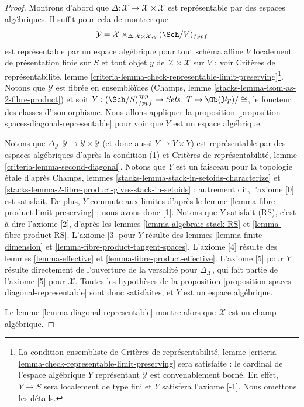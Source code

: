 \begin{proof}
Montrons d'abord que
$\Delta : \mathcal{X} \to \mathcal{X} \times \mathcal{X}$ est représentable
par des espaces algébriques. Il suffit pour cela de montrer que
$$
\mathcal{Y} =
\mathcal{X} \times_{\Delta, \mathcal{X} \times \mathcal{X}, y} (\Sch/V)_{fppf}
$$
est représentable par un espace algébrique pour tout schéma affine $V$
localement de présentation finie sur $S$ et tout objet $y$ de
$\mathcal{X} \times \mathcal{X}$ sur $V$ ; voir Critères de représentabilité,
lemme
\ref{criteria-lemma-check-representable-limit-preserving}\footnote{La
condition ensembliste de Critères de représentabilité, lemme
\ref{criteria-lemma-check-representable-limit-preserving}
sera satisfaite : le cardinal de l'espace algébrique $Y$ représentant
$\mathcal{Y}$ est convenablement borné. En effet, $Y \to S$ sera localement
de type fini et $Y$ satisfera l'axiome [-1]. Nous omettons les détails.}.
Notons que $\mathcal{Y}$ est fibrée en ensemblöïdes (Champs, lemme
\ref{stacks-lemma-isom-as-2-fibre-product}) et soit
$Y : (\Sch/S)_{fppf}^{opp} \to \textit{Sets}$,
$T \mapsto \Ob(\mathcal{Y}_T)/\cong$, le foncteur des classes d'isomorphisme.
Nous allons appliquer la proposition
\ref{proposition-spaces-diagonal-representable} pour voir que $Y$ est un
espace algébrique.

\medskip\noindent
Notons que
$\Delta_\mathcal{Y} : \mathcal{Y} \to \mathcal{Y} \times \mathcal{Y}$
(et donc aussi $Y \to Y \times Y$) est représentable par des espaces
algébriques d'après la condition (1) et Critères de représentabilité, lemme
\ref{criteria-lemma-second-diagonal}. Notons que $Y$ est un faisceau pour la
topologie étale d'après Champs, lemmes
\ref{stacks-lemma-stack-in-setoids-characterize} et
\ref{stacks-lemma-2-fibre-product-gives-stack-in-setoids} ; autrement dit,
l'axiome [0] est satisfait. De plus, $Y$ commute aux limites d'après le lemme
\ref{lemma-fibre-product-limit-preserving} ; nous avons donc [1]. Notons que
$Y$ satisfait (RS), c'est-à-dire l'axiome [2], d'après les lemmes
\ref{lemma-algebraic-stack-RS} et \ref{lemma-fibre-product-RS}. L'axiome [3]
pour $Y$ résulte des lemmes \ref{lemma-finite-dimension} et
\ref{lemma-fibre-product-tangent-spaces}. L'axiome [4] résulte des lemmes
\ref{lemma-effective} et \ref{lemma-fibre-product-effective}. L'axiome [5]
pour $Y$ résulte directement de l'ouverture de la versalité pour
$\Delta_\mathcal{X}$, qui fait partie de l'axiome [5] pour $\mathcal{X}$.
Toutes les hypothèses de la proposition
\ref{proposition-spaces-diagonal-representable} sont donc satisfaites, et $Y$
est un espace algébrique.

\medskip\noindent
Le lemme \ref{lemma-diagonal-representable} montre alors que $\mathcal{X}$ est
un champ algébrique.
\end{proof}





